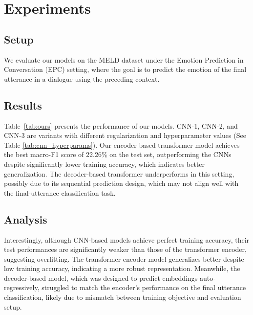 \documentclass{article}
\begin{document}
\section{Experiments}

\subsection{Setup}
We evaluate our models on the MELD dataset under the Emotion Prediction in Conversation (EPC) setting, where the goal is to predict the emotion of the final utterance in a dialogue using the preceding context.

\subsection{Results}
Table~\ref{tab:ours} presents the performance of our models. CNN-1, CNN-2, and CNN-3 are variants with different regularization and hyperparameter values (See Table \ref{tab:cnn_hyperparams}). Our encoder-based transformer model achieves the best macro-F1 score of 22.26\% on the test set, outperforming the CNNs despite significantly lower training accuracy, which indicates better generalization. The decoder-based transformer underperforms in this setting, possibly due to its sequential prediction design, which may not align well with the final-utterance classification task.

\begin{table}[h]
\centering
\caption{Performance metrics of our models on MELD.}
\label{tab:ours}
\end{table}

\subsection{Analysis}
Interestingly, although CNN-based models achieve perfect training accuracy, their test performances are significantly weaker than those of the transformer encoder, suggesting overfitting. The transformer encoder model generalizes better despite low training accuracy, indicating a more robust representation. Meanwhile, the decoder-based model, which was designed to predict embeddings auto-regressively, struggled to match the encoder’s performance on the final utterance classification, likely due to mismatch between training objective and evaluation setup.
\end{document}
